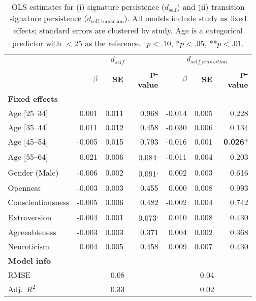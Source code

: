 \begin{table}[ht]
\centering
\small
\begin{tabular}{@{}lrrr rrr@{}}
\toprule
& \multicolumn{3}{c}{\textbf{$d_{self}$}} & \multicolumn{3}{c}{\textbf{$d_{self\_transition}$}} \\
\cmidrule(lr){2-4}\cmidrule(l){5-7}
& \textbf{$\beta$} & \textbf{SE} & \textbf{p-value} & \textbf{$\beta$} & \textbf{SE} & \textbf{p-value} \\
\midrule
\textbf{Fixed effects} \\
Age [25--34]      &  0.001 & 0.011 & 0.968 & -0.014 & 0.005 & 0.228 \\
Age [35--44]      &  0.011 & 0.012 & 0.458 & -0.030 & 0.006 & 0.134 \\
Age [45--54]      & -0.005 & 0.015 & 0.793 & -0.016 & 0.001 & \textbf{0.026}* \\
Age [55--64]      &  0.021 & 0.006 & 0.084\textsuperscript{.} & -0.011 & 0.004 & 0.203 \\
Gender (Male)     & -0.006 & 0.002 & 0.091\textsuperscript{.} &  0.002 & 0.003 & 0.616 \\
Openness          & -0.003 & 0.003 & 0.455 &  0.000 & 0.008 & 0.993 \\
Conscientiousness & -0.005 & 0.006 & 0.482 & -0.002 & 0.004 & 0.742 \\
Extroversion      & -0.004 & 0.001 & 0.073\textsuperscript{.} &  0.010 & 0.008 & 0.430 \\
Agreeableness     & -0.003 & 0.003 & 0.371 &  0.004 & 0.002 & 0.368 \\
Neuroticism       &  0.004 & 0.005 & 0.458 &  0.009 & 0.007 & 0.430 \\
\midrule
\textbf{Model info} \\

RMSE              & \multicolumn{3}{c}{0.08} & \multicolumn{3}{c}{0.04} \\
Adj.\ $R^2$       & \multicolumn{3}{c}{0.33} & \multicolumn{3}{c}{0.02} \\
\bottomrule

\end{tabular}
\caption[OLS of routine signatures]{OLS estimates for (i) signature persistence ($d_{\text{self}}$) and (ii) transition signature persistence ($d_{\text{self,transition}}$). All models include study as fixed effects; standard errors are clustered by study. Age is a categorical predictor with $<\!25$ as the reference. \textsuperscript{.}\,$p<.10$, *$p<.05$, **$p<.01$.}
\label{tab:ols_signature}
\end{table}

